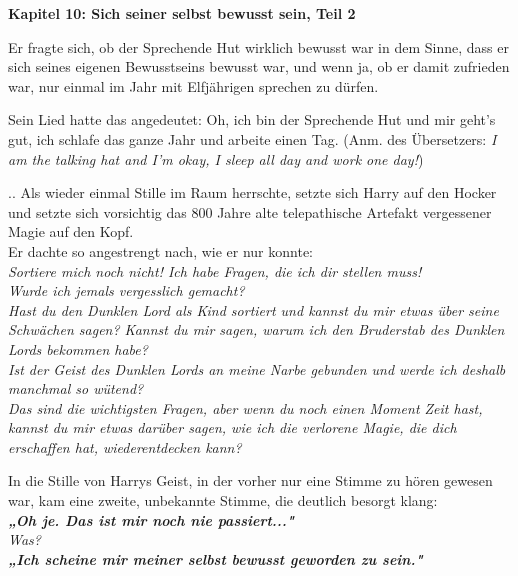 

\hypertarget{sich-seiner-selbst-bewusst-sein-teil-2}{%

\textbf{Kapitel 10: Sich seiner selbst bewusst sein, Teil 2}

Er fragte sich, ob der Sprechende Hut wirklich bewusst war in dem Sinne, dass er sich seines eigenen Bewusstseins bewusst war, und wenn ja, ob er damit zufrieden war, nur einmal im Jahr mit Elfjährigen sprechen zu dürfen.

Sein Lied hatte das angedeutet: Oh, ich bin der Sprechende Hut und mir geht's gut, ich schlafe das ganze Jahr und arbeite einen Tag. (Anm. des Übersetzers: \emph{I am the talking hat and I'm okay, I sleep all day and work one day!})

.. Als wieder einmal Stille im Raum herrschte, setzte sich Harry auf den Hocker und setzte sich vorsichtig das 800 Jahre alte telepathische Artefakt vergessener Magie auf den Kopf.\\ Er dachte so angestrengt nach, wie er nur konnte:\\ \emph{Sortiere mich noch nicht! Ich habe Fragen, die ich dir stellen muss!\\ Wurde ich jemals vergesslich gemacht?}\\ \emph{Hast du den Dunklen Lord als Kind sortiert und kannst du mir etwas über seine Schwächen sagen? Kannst du mir sagen, warum ich den Bruderstab des Dunklen Lords bekommen habe?}\\ \emph{Ist der Geist des Dunklen Lords an meine Narbe gebunden und werde ich deshalb manchmal so wütend?}\\ \emph{Das sind die wichtigsten Fragen, aber wenn du noch einen Moment Zeit hast, kannst du mir etwas darüber sagen, wie ich die verlorene Magie, die dich erschaffen hat, wiederentdecken kann?}

In die Stille von Harrys Geist, in der vorher nur eine Stimme zu hören gewesen war, kam eine zweite, unbekannte Stimme, die deutlich besorgt klang:\\ \textbf{\emph{„Oh je. Das ist mir noch nie passiert..."}}\\ \emph{Was?}\\ \textbf{\emph{„Ich scheine mir meiner selbst bewusst geworden zu sein."}}

}
